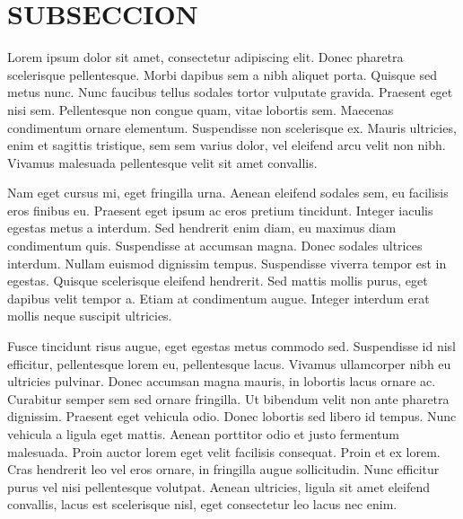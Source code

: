 \section{SUBSECCION}
Lorem ipsum dolor sit amet, consectetur adipiscing elit. Donec pharetra scelerisque pellentesque. Morbi dapibus sem a nibh aliquet porta. Quisque sed metus nunc. Nunc faucibus tellus sodales tortor vulputate gravida. Praesent eget nisi sem. Pellentesque non congue quam, vitae lobortis sem. Maecenas condimentum ornare elementum. Suspendisse non scelerisque ex. Mauris ultricies, enim et sagittis tristique, sem sem varius dolor, vel eleifend arcu velit non nibh. Vivamus malesuada pellentesque velit sit amet convallis.

Nam eget cursus mi, eget fringilla urna. Aenean eleifend sodales sem, eu facilisis eros finibus eu. Praesent eget ipsum ac eros pretium tincidunt. Integer iaculis egestas metus a interdum. Sed hendrerit enim diam, eu maximus diam condimentum quis. Suspendisse at accumsan magna. Donec sodales ultrices interdum. Nullam euismod dignissim tempus. Suspendisse viverra tempor est in egestas. Quisque scelerisque eleifend hendrerit. Sed mattis mollis purus, eget dapibus velit tempor a. Etiam at condimentum augue. Integer interdum erat mollis neque suscipit ultricies.

Fusce tincidunt risus augue, eget egestas metus commodo sed. Suspendisse id nisl efficitur, pellentesque lorem eu, pellentesque lacus. Vivamus ullamcorper nibh eu ultricies pulvinar. Donec accumsan magna mauris, in lobortis lacus ornare ac. Curabitur semper sem sed ornare fringilla. Ut bibendum velit non ante pharetra dignissim. Praesent eget vehicula odio. Donec lobortis sed libero id tempus. Nunc vehicula a ligula eget mattis. Aenean porttitor odio et justo fermentum malesuada. Proin auctor lorem eget velit facilisis consequat. Proin et ex lorem. Cras hendrerit leo vel eros ornare, in fringilla augue sollicitudin. Nunc efficitur purus vel nisi pellentesque volutpat. Aenean ultricies, ligula sit amet eleifend convallis, lacus est scelerisque nisl, eget consectetur leo lacus nec enim.